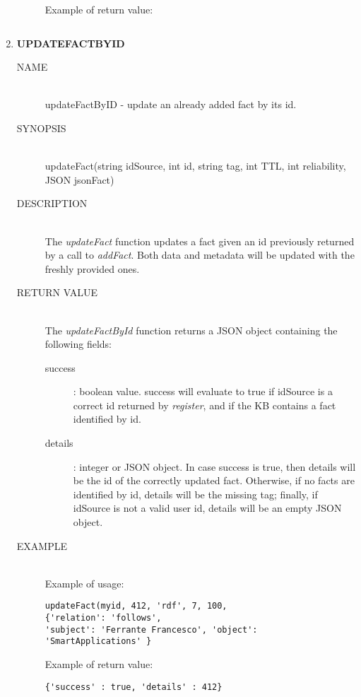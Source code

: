 \documentclass{article}
\begin{document}
\begin{enumerate}
\begin{description}
    	Example of return value:
        \begin{lstlisting}
        \end{lstlisting}
        \end{description}
    \item \textbf{UPDATEFACTBYID}
        \begin{description}
        \item[NAME] \hfill \\
        updateFactByID - update an already added fact by its id.
    	\item[SYNOPSIS] \hfill \\
	    updateFact(string idSource, int id, string tag, int TTL, int reliability, JSON jsonFact)
    	\item[DESCRIPTION] \hfill \\
    		The \textit{updateFact} function updates a fact given an id previously returned by a call to \textit{addFact}. Both data and metadata will be updated with the freshly provided ones.
        \item[RETURN VALUE] \hfill \\
        The \textit{updateFactById} function returns a JSON object containing the following fields:
        \begin{description}
		    \item[success]: boolean value.
		    success will evaluate to true if idSource is a correct id returned by \textit{register}, and if the KB contains a fact identified by id.
		    \item[details]: integer or JSON object.
		    In case success is true, then details will be the id of the correctly updated fact. Otherwise, if no facts are identified by id, details will be the missing tag; finally, if idSource is not a valid user id, details will be an empty JSON object.
		\end{description}
        \item[EXAMPLE] \hfill \\
    	Example of usage:
    	\begin{lstlisting}
updateFact(myid, 412, 'rdf', 7, 100, 
{'relation': 'follows', 
'subject': 'Ferrante Francesco', 'object': 'SmartApplications' }
    	\end{lstlisting}
    	Example of return value:
        \begin{lstlisting}
{'success' : true, 'details' : 412}
        \end{lstlisting}
        \end{description}
\end{enumerate}
\end{document}
